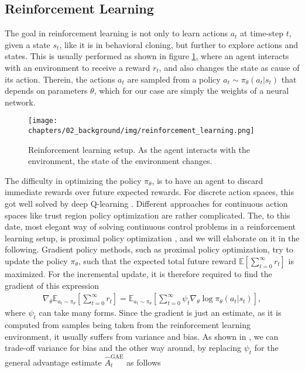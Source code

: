 \FloatBarrier
\subsection{Reinforcement Learning}
\label{sec::223_rl}
The goal in reinforcement learning is not only to learn actions $a_t$ at time-step $t$, given a state $s_t$, like it is in behavioral cloning, but further to explore actions and states. This is usually performed as shown in figure \ref{fig::223_rl}, where an agent interacts with an environment to receive a reward $r_t$, and also changes the state as cause of its action. Therein, the actions $a_t$ are sampled from a policy $a_t\sim\pi_\theta(a_t|s_t)$ that depends on parameters $\theta$, which for our case are simply the weights of a neural network. 
\begin{figure}[h!]
	\centering
	\texttt{[image: chapters/02\_background/img/reinforcement\_learning.png]}
	\caption{Reinforcement learning setup. As the agent interacts with the environment, the state of the environment changes.}
	\label{fig::223_rl}
\end{figure}
The difficulty in optimizing the policy $\pi_\theta$, is to have an agent to discard immediate rewards over future expected rewards. For discrete action spaces, this got well solved by deep Q-learning \cite{mnih2015human}. Different approaches for continuous action spaces like trust region policy optimization \cite{schulman2015trust} are rather complicated. The, to this date, most elegant way of solving continuous control problems in a reinforcement learning setup, is proximal policy optimization \cite{schulman2017proximal}, and we will elaborate on it in the following. Gradient policy methods, such as proximal policy optimization, try to update the policy $\pi_\theta$, such that the expected total future reward $\mathbb{E}\left[\sum_{t=0}^\infty r_t\right]$ is maximized. For the incremental update, it is therefore required to find the gradient of this expression
\begin{align}
	\nabla_\theta\mathbb{E}_{a_t\sim\pi_\theta}\left[\sum_{t=0}^\infty r_t\right] = \mathbb{E}_{a_t\sim\pi_\theta}\left[\sum_{t=0}^\infty\psi_t\nabla_\theta\log\pi_\theta(a_t|s_t)\right],
\end{align}
where $\psi_t$ can take many forms. Since the gradient is just an estimate, as it is computed from samples being taken from the reinforcement learning environment, it usually suffers from variance and bias. As shown in \cite{schulman2015high}, we can trade-off variance for bias and the other way around, by replacing $\psi_t$ for the general advantage estimate $\hat{A}^\text{GAE}_t$ as follows
